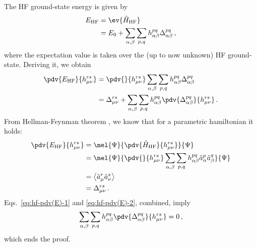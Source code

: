 \begin{tabproof}
	
	The HF ground-state energy is given by
	\[
	\begin{aligned}
		E_\mathrm{HF} &= \ev{\hat H_\mathrm{HF}} \\
		&= E_0 + \sum_{\alpha,\beta} \sum_{p,q} h_{\alpha\beta}^{pq} \Delta_{\alpha\beta}^{pq} \, ,
	\end{aligned}
	\]
	where the expectation value is taken over the (up to now unknown) HF ground-state. Deriving it, we obtain
	\begin{align}
		\pdv{E_\mathrm{HF}}{h_{\mu\nu}^{rs}} &= \pdv{}{h_{\mu\nu}^{rs}} \sum_{\alpha,\beta} \sum_{p,q} h_{\alpha\beta}^{pq} \Delta_{\alpha\beta}^{pq} \nonumber \\
		&= \Delta_{\mu\nu}^{rs} + \sum_{\alpha,\beta} \sum_{p,q} h_{\alpha\beta}^{pq} \pdv{\Delta_{\alpha\beta}^{pq}}{h_{\mu\nu}^{rs}} \, . \label{eq:hf-pdv(E)-1}
	\end{align}
	From Hellman-Feynman theorem \cite{grosso2014solid}, we know that for a parametric hamiltonian it holds:
	\begin{align}
		\pdv{E_\mathrm{HF}}{h_{\mu\nu}^{rs}} &= \mel{\Psi}{\pdv{\hat H_\mathrm{HF}}{h_{\mu\nu}^{rs}}}{\Psi} \nonumber \\
		&= \mel{\Psi}{\pdv{}{h_{\mu\nu}^{rs}}\sum_{\alpha,\beta} \sum_{p,q} h_{\alpha\beta}^{pq} \hat a_\alpha^p \hat a_\beta^q}{\Psi} \nonumber \\
		&= \big\langle \hat a_\mu^r \hat a_\nu^s \big\rangle \nonumber \\
		&= \Delta_{\mu\nu}^{rs} \, . \label{eq:hf-pdv(E)-2}
	\end{align}
	Eqs.~\eqref{eq:hf-pdv(E)-1} and \eqref{eq:hf-pdv(E)-2}, combined, imply
	\[
		\sum_{\alpha,\beta} \sum_{p,q} h_{\alpha\beta}^{pq} \pdv{\Delta_{\alpha\beta}^{pq}}{h_{\mu\nu}^{rs}} = 0 \, , 
	\]
	which ends the proof.
\end{tabproof}

